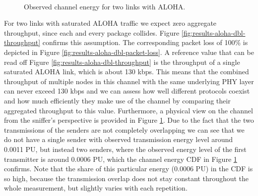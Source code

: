 \begin{figure}[tb]
	\label{fig:results-aloha-dbl-channel-meta}
	\begin{center}
		\\
	\end{center}
	\caption{Observed channel energy for two links with ALOHA.}
\end{figure}

For two links with saturated ALOHA traffic we expect zero aggregate throughput, since each and every package collides. Figure \ref{fig:results-aloha-dbl-throughput} confirms this assumption. The corresponding packet loss of 100\% is depicted in Figure \ref{fig:results-aloha-dbl-packet-loss}. A reference value that can be read off Figure \ref{fig:results-aloha-dbl-throughput} is the throughput of a single saturated ALOHA link, which is about 130 kbps. This means that the combined throughput of multiple nodes in this channel with the same underlying PHY layer can never exceed 130 kbps and we can assess how well different protocols coexist and how much efficiently they make use of the channel by comparing their aggregated throughput to this value. Furthermore, a physical view on the channel from the sniffer's perspective is provided in Figure \ref{fig:results-aloha-dbl-channel-meta}. Due to the fact that the two transmissions of the senders are not completely overlapping we can see that we do not have a single sender with observed transmission energy level around 0.0011 PU, but instead two senders, where the observed energy level of the first transmitter is around 0.0006 PU, which the channel energy CDF in Figure \ref{fig:results-aloha-dbl-channel-meta} confirms. Note that the share of this particular energy (0.0006 PU) in the CDF is so high, because the transmission overlap does not stay constant throughout the whole measurement, but slightly varies with each repetition.

